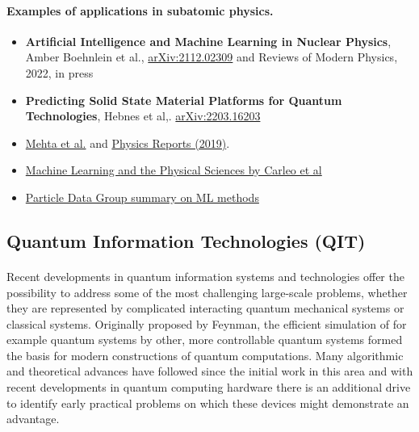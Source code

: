 \documentclass[%
oneside,                 %
final,                   %
10pt]{article}
\begin{document}
\paragraph{Examples of applications in subatomic physics.}
\begin{itemize}
\item \textbf{Artificial Intelligence and Machine Learning in Nuclear Physics}, Amber Boehnlein et al., \href{{https://arxiv.org/abs/2112.02309}}{arXiv:2112.02309} and Reviews of Modern Physics, 2022, in press

\item \textbf{Predicting Solid State Material Platforms for Quantum Technologies}, Hebnes et al,. \href{{https://arxiv.org/abs/2203.16203}}{arXiv:2203.16203}

\item \href{{https://arxiv.org/abs/1803.08823}}{Mehta et al.} and \href{{https://www.sciencedirect.com/science/article/pii/S0370157319300766?via%

\item \href{{https://link.aps.org/doi/10.1103/RevModPhys.91.045002}}{Machine Learning and the Physical Sciences by Carleo et al}

\item \href{{https://pdg.lbl.gov/2021/reviews/rpp2021-rev-machine-learning.pdf}}{Particle Data Group summary on ML methods}
\end{itemize}

\noindent



\subsection*{Quantum Information Technologies (QIT)}


\paragraph{}
Recent developments in quantum information systems
and technologies offer the possibility to address some of the most
challenging large-scale problems, whether they are represented by
complicated interacting quantum mechanical systems or classical
systems.  Originally proposed by Feynman, the efficient simulation of
for example quantum systems by other, more controllable quantum
systems formed the basis for modern constructions of quantum
computations.  Many algorithmic and theoretical advances have followed
since the initial work in this area and with recent developments in
quantum computing hardware there is an additional drive to identify
early practical problems on which these devices might demonstrate an
advantage.
\end{document}

